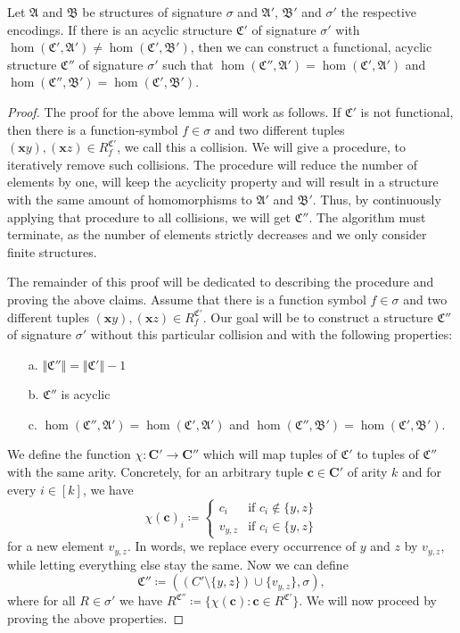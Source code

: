\begin{lemma}
	Let $\mathfrak A$ and $\mathfrak B$ be structures of signature $\sigma$ and $\mathfrak A'$, $\mathfrak B'$ and $\sigma'$ the respective encodings.
	If there is an acyclic structure $\mathfrak C'$ of signature $\sigma'$ with $\hom(\mathfrak C',\mathfrak A')\neq\hom(\mathfrak C',\mathfrak B')$, then we can construct a functional, acyclic structure $\mathfrak C''$ of signature $\sigma'$ such that $\hom(\mathfrak C'',\mathfrak A')=\hom(\mathfrak C',\mathfrak A')$ and $\hom(\mathfrak C'',\mathfrak B')=\hom(\mathfrak C',\mathfrak B')$.
\end{lemma}
\begin{proof}
	The proof for the above lemma will work as follows.
	If $\mathfrak C'$ is not functional, then there is a function-symbol $f\in\sigma$ and two different tuples $(\mathbf xy),(\mathbf xz)\in R^{\mathfrak C'}_f$, we call this a collision.
	We will give a procedure, to iteratively remove such collisions.
	The procedure will reduce the number of elements by one, will keep the acyclicity property and will result in a structure with the same amount of homomorphisms to $\mathfrak A'$ and $\mathfrak B'$.
	Thus, by continuously applying that procedure to all collisions, we will get $\mathfrak C''$.
	The algorithm must terminate, as the number of elements strictly decreases and we only consider finite structures.
	
	The remainder of this proof will be dedicated to describing the procedure and proving the above claims.
	Assume that there is a function symbol $f\in \sigma$ and two different tuples $(\mathbf x y),(\mathbf x z)\in R_f^{\mathfrak C'}$. 
	Our goal will be to construct a structure $\mathfrak C''$ of signature $\sigma'$ without this particular collision and with the following properties:
	\begin{itemize}
		\item[a.] $\Vert \mathfrak C'' \Vert = \Vert \mathfrak C'\Vert -1$
		\item[b.] $\mathfrak C''$ is acyclic
		\item[c.] $\hom(\mathfrak C'',\mathfrak A')=\hom(\mathfrak C',\mathfrak A')$ and $\hom(\mathfrak C'',\mathfrak B')=\hom(\mathfrak C',\mathfrak B')$.
	\end{itemize}
	We define the function $\chi : \mathbf{C'}\to\mathbf{C''}$ which will map tuples of $\mathfrak C'$ to tuples of $\mathfrak C''$ with the same arity.
	Concretely, for an arbitrary tuple $\mathbf c\in \mathbf{C'}$ of arity $k$ and for every $i\in[k]$, we have
	$$\chi(\mathbf c)_i \coloneqq \begin{cases}
		c_i & \text{if } c_i\notin \{y,z\} \\
		v_{y,z} & \text{if } c_i \in \{y,z\}
	\end{cases}$$
	for a new element $v_{y,z}$.
	In words, we replace every occurrence of $y$ and $z$ by $v_{y,z}$, while letting everything else stay the same.
	Now we can define 
	$$\mathfrak C'' \coloneqq ((C' \setminus \{y,z\})\cup \{v_{y,z}\}, \sigma),$$
	where for all $R\in\sigma'$ we have $R^{\mathfrak C''}\coloneqq \{\chi(\mathbf c) : \mathbf c\in R^{\mathfrak C'}\}$.
	We will now proceed by proving the above properties.
	

\end{proof}
